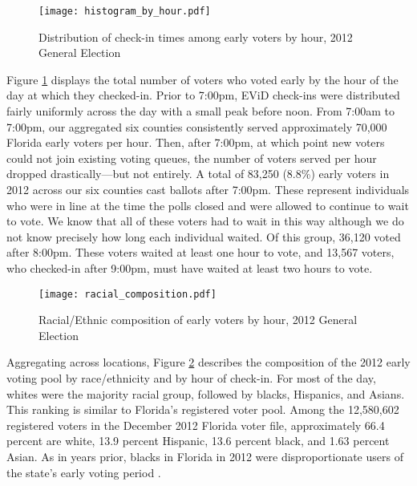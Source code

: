 \documentclass[12pt,titlepage]{article}
\begin{document}
\begin{figure}[!ht]
\caption{Distribution of check-in times among early voters by hour, 2012 General Election}
  \label{fig:hist2012}
  \centering
    \centering\texttt{[image: histogram\_by\_hour.pdf]}
\end{figure}

Figure \ref{fig:hist2012} displays the total number of voters who
voted early by the hour of the day at which they checked-in. Prior to
7:00pm, EViD check-ins were distributed fairly uniformly across the
day with a small peak before noon.  From 7:00am to 7:00pm, our
aggregated six counties consistently served approximately 70,000
Florida early voters per hour. Then, after 7:00pm, at which point new
voters could not join existing voting queues, the number of voters
served per hour dropped drastically---but not entirely.  A total of
83,250 (8.8\%) early voters in 2012 across our six counties cast
ballots after 7:00pm. These represent individuals who were in line at
the time the polls closed and were allowed to continue to wait to
vote.  We know that all of these voters had to wait in this way
although we do not know precisely how long each individual waited.  Of
this group, 36,120 voted after 8:00pm.  These voters waited at least
one hour to vote, and 13,567 voters, who checked-in after 9:00pm, must
have waited at least two hours to vote.




\begin{figure}[!ht]
\caption{Racial/Ethnic composition of early voters by hour, 2012 General Election}
  \label{fig:race2012}
  \centering
    \centering\texttt{[image: racial\_composition.pdf]}
\end{figure}

Aggregating across locations, Figure \ref{fig:race2012} describes the
composition of the 2012 early voting pool by race/ethnicity and by
hour of check-in.  For most of the day, whites were the majority
racial group, followed by blacks, Hispanics, and Asians.  This ranking
is similar to Florida's registered voter pool.  Among the 12,580,602
registered voters in the December 2012 Florida voter file,
approximately 66.4 percent are white, 13.9 percent Hispanic, 13.6
percent black, and 1.63 percent Asian.  As in years prior, blacks in
Florida in 2012 were disproportionate users of the state's early
voting period \citep{herronsmith:souls}.
\end{document}
